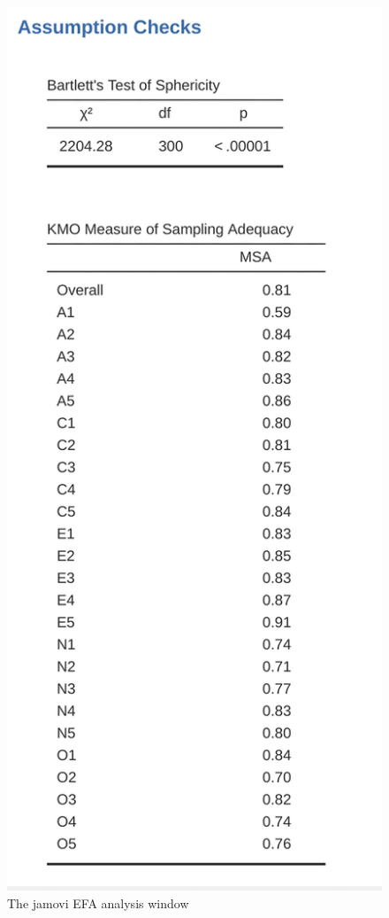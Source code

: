 \documentclass[
  a4paper,
]{book}
\begin{document}
\begin{figure}

\includegraphics[width=1\textwidth,height=\textheight]{images/fig15-3.png} \hfill{}

\caption{\label{fig-fig15-3}The jamovi EFA analysis window}

\end{figure}
\end{document}
